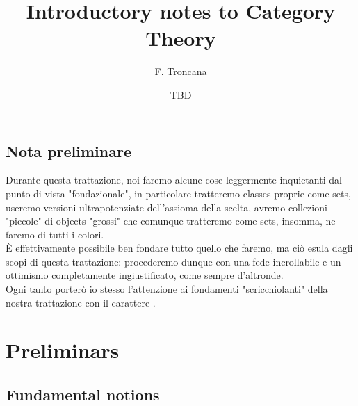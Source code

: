\documentclass{article}
\title{Introductory notes to Category Theory}
\author{F. Troncana}
\date{TBD}
\begin{document}
\maketitle

\subsection*{Nota preliminare}

Durante questa trattazione, noi faremo alcune cose leggermente inquietanti dal punto di vista "fondazionale", in particolare tratteremo classes proprie come sets, useremo versioni ultrapotenziate dell'assioma della scelta, avremo collezioni "piccole" di objects "grossi" che comunque tratteremo come sets, insomma, ne faremo di tutti i colori.\\
È effettivamente possibile ben fondare tutto quello che faremo, ma ciò esula dagli scopi di questa trattazione: procederemo dunque con una fede incrollabile e un ottimismo completamente ingiustificato, come sempre d'altronde.\\
Ogni tanto porterò io stesso l'attenzione ai fondamenti "scricchiolanti" della nostra trattazione con il carattere \PHcat.

\section{Preliminars}

\subsection{Fundamental notions}
\end{document}
